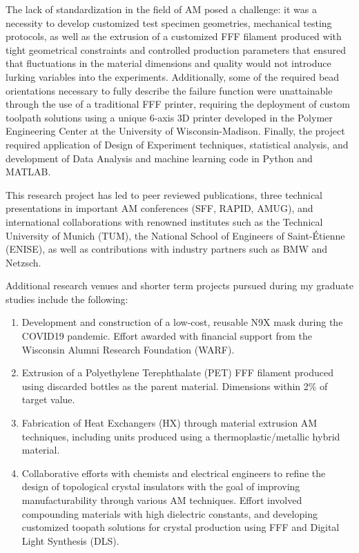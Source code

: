 \documentclass[11pt,letterpaper]{article}
\begin{document}
	The lack of standardization in the field of AM posed a challenge: it was a necessity to develop customized test specimen geometries, mechanical testing protocols, as well as the extrusion of a customized FFF filament produced with tight geometrical constraints and controlled production parameters that ensured that fluctuations in the material dimensions and quality would not introduce lurking variables into the experiments. Additionally, some of the required bead orientations necessary to fully describe the failure function were unattainable through the use of a traditional FFF printer, requiring the deployment of custom toolpath solutions using a unique 6-axis 3D printer developed in the Polymer Engineering Center at the University of Wisconsin-Madison. Finally, the project required application of Design of Experiment techniques, statistical analysis, and development of Data Analysis and machine learning code in Python and MATLAB.
	
	This research project has led to peer reviewed publications, three technical presentations in important AM conferences (SFF, RAPID, AMUG), and international collaborations with renowned institutes such as the Technical University of Munich (TUM), the National School of Engineers of Saint-\'Etienne (ENISE), as well as contributions with industry partners such as BMW and Netzsch.
	
	
	Additional research venues and shorter term projects pursued during my graduate studies include the following:
	\begin{enumerate}
		\item Development and construction of a low-cost, reusable N9X mask during the COVID19 pandemic. Effort awarded with financial support from the Wisconsin Alumni Research Foundation (WARF).
		\item Extrusion of a Polyethylene Terephthalate (PET) FFF filament produced using discarded bottles as the parent material. Dimensions within 2\% of target value.
		\item Fabrication of Heat Exchangers (HX) through material extrusion AM techniques, including units produced using a thermoplastic/metallic hybrid material.
		\item Collaborative efforts with chemists and electrical engineers to refine the design of topological crystal insulators with the goal of improving manufacturability through various AM techniques. Effort involved compounding materials with high dielectric constants, and developing customized toopath solutions for crystal production using FFF and Digital Light Synthesis (DLS).
	\end{enumerate}
	
\end{document}
